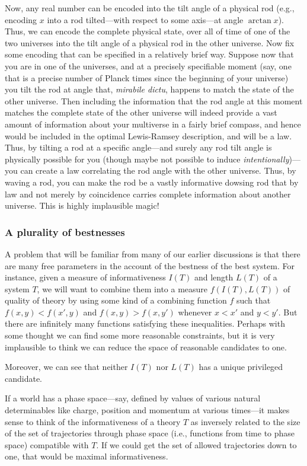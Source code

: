 Now, any real number can be encoded into the tilt angle of a physical rod (e.g., encoding $x$ into a rod tilted---with respect to some
axis---at angle $\arctan x$). Thus, we can encode the complete physical state, over all of time of one of the two universes into the tilt angle of a physical rod
in the other universe. Now fix some encoding that can be specified in a relatively brief way. Suppose now that you are in one of the 
universes, and at a precisely specifiable moment (say, one that is a precise number of Planck times since the beginning of your universe)
you tilt the rod at angle that, \textit{mirabile dictu}, happens to match the state of the other universe. Then including the information that the 
rod angle at this moment matches the complete state of the other universe will indeed provide a vast amount of information about your 
multiverse in a fairly brief compass, and hence would be included in the optimal Lewis-Ramsey description, and will be a law. Thus, by
tilting a rod at a specific angle---and surely any rod tilt angle is physically possible for you (though maybe not possible to induce
\textit{intentionally})---you can create a law correlating the rod angle with the other universe. Thus, by waving a rod, you can make
the rod be a vastly informative dowsing rod that by law and not merely by coincidence carries complete information about another universe.
This is highly implausible magic!

\subsubsection{A plurality of bestnesses}
A problem that will be familiar from many of our earlier discussions is that there are many free parameters in the account of 
the bestness of the best system. For instance, given a measure of informativeness $I(T)$ and length $L(T)$ of a system
$T$, we will want to combine them into a measure $f(I(T),L(T))$ of quality of theory by using some kind
of a combining function $f$ such that $f(x,y)<f(x',y)$ 
and $f(x,y)>f(x,y')$ whenever $x<x'$ and $y<y'$. But there are infinitely many functions satisfying these inequalities. Perhaps
with some thought we can find some more reasonable constraints, but it is very implausible to think we can reduce the space
of reasonable candidates to one.

Moreover, we can see that neither $I(T)$ nor $L(T)$ has a unique privileged candidate.

If a world has a phase space---say, defined by values of various natural determinables like charge, position and momentum at various 
times---it makes sense to think of the informativeness of a theory $T$ as inversely related to the size of the set of trajectories through 
phase space (i.e., functions from time to phase space) compatible with $T$. If we could get the set of allowed trajectories down to one,
that would be maximal informativeness. 

